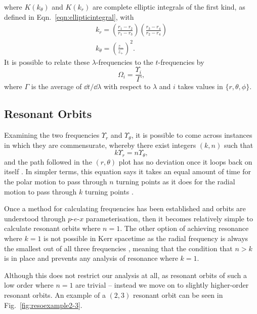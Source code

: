 where $K(k_\theta)$ and $K(k_r)$ are complete elliptic integrals of the first kind, as defined in Eqn.~\eqref{eqn:ellipticintegral}, with
\begin{gather}
k_r=\left(\frac{r_1-r_2}{r_1-r_3}\right)\left(\frac{r_3-r_4}{r_2-r_4}\right)\\
k_\theta=\left(\frac{z_-}{z_+} \right)^2.
\end{gather}
It is possible to relate these $\lambda$-frequencies to the $t$-frequencies by
\begin{equation}
\Omega_i=\frac{\Upsilon_i}{\Gamma},
\end{equation}
where $\Gamma$ is the average of $\dd{t}/\dd{\lambda}$ with respect to $\lambda$ and $i$ takes values in $\{r,\theta,\phi\}$.


\subsection{Resonant Orbits}
Examining the two frequencies $\Upsilon_r$ and $\Upsilon_\theta$, it is possible to come across instances in which they are commensurate, whereby there exist integers $(k,n)$ such that
\begin{equation}\label{eqn:resCond}
    k\Upsilon_r=n\Upsilon_\theta,
\end{equation}
and the path followed in the $(r,\theta)$ plot has no deviation once it loops back on itself \cite{ResonantCensus}.
In simpler terms, this equation says it takes an equal amount of time for the polar motion to pass through $n$ turning points as it does for the radial motion to pass through $k$ turning points \cite{brinkKerrResonance}. 

Once a method for calculating frequencies has been established and orbits are understood through $p$-$e$-$x$ parameterisation, then it becomes relatively simple to calculate resonant orbits where $n=1$.
The other option of achieving resonance where $k=1$ is not possible in Kerr spacetime as the radial frequency is always the smallest out of all three frequencies \cite{brinkKerrResonance}, meaning that the condition that $n>k$ is in place and prevents any analysis of resonance where $k=1$.

Although this does not restrict our analysis at all, as resonant orbits of such a low order where $n=1$ are trivial -- instead we move on to slightly higher-order resonant orbits.
An example of a $(2,3)$ resonant orbit can be seen in Fig.~\eqref{fig:resoexample2-3}.

